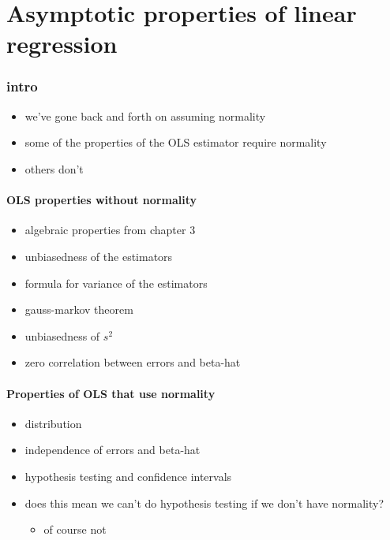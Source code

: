 
\part*{Asymptotic properties of linear regression}%

\section{intro}

\begin{itemize}
\item we've gone back and forth on assuming normality
\item some of the properties of the OLS estimator require normality
\item others don't
\end{itemize}

\subsection{OLS properties without normality}

\begin{itemize}
\item algebraic properties from chapter 3
\item unbiasedness of the estimators
\item formula for variance of the estimators
\item gauss-markov theorem
\item unbiasedness of $s^2$
\item zero correlation between errors and beta-hat
\end{itemize}

\subsection{Properties of OLS that use normality}

\begin{itemize}
\item distribution
\item independence of errors and beta-hat
\item hypothesis testing and confidence intervals
\item does this mean we can't do hypothesis testing if we don't have
       normality?
\begin{itemize}
\item of course not
\end{itemize}
\end{itemize}

